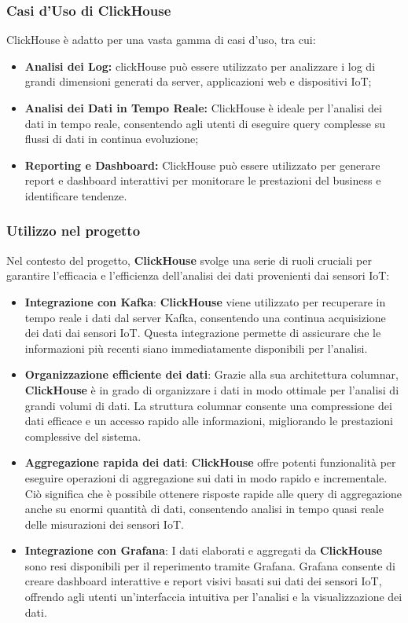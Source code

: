 \subsubsection{Casi d'Uso di ClickHouse}
ClickHouse è adatto per una vasta gamma di casi d'uso, tra cui:
\begin{itemize}
    \item \textbf{Analisi dei Log:} clickHouse può essere utilizzato per analizzare i log di grandi dimensioni generati da server, applicazioni web e dispositivi IoT;
    \item \textbf{Analisi dei Dati in Tempo Reale:} ClickHouse è ideale per l'analisi dei dati in tempo reale, consentendo agli utenti di eseguire query complesse su flussi di dati in continua evoluzione;
    \item \textbf{Reporting e Dashboard:} ClickHouse può essere utilizzato per generare report e dashboard interattivi per monitorare le prestazioni del business e identificare tendenze.
\end{itemize}


\subsubsection{Utilizzo nel progetto}
Nel contesto del progetto, \textbf{ClickHouse} svolge una serie di ruoli cruciali per garantire l'efficacia e l'efficienza dell'analisi dei dati provenienti dai sensori IoT:

\begin{itemize}
  \item \textbf{Integrazione con Kafka}: \textbf{ClickHouse} viene utilizzato per recuperare in tempo reale i dati dal server Kafka, consentendo una continua acquisizione dei dati dai sensori IoT. Questa integrazione permette di assicurare che le informazioni più recenti siano immediatamente disponibili per l'analisi.
  
  \item \textbf{Organizzazione efficiente dei dati}: Grazie alla sua architettura columnar, \textbf{ClickHouse} è in grado di organizzare i dati in modo ottimale per l'analisi di grandi volumi di dati. La struttura columnar consente una compressione dei dati efficace e un accesso rapido alle informazioni, migliorando le prestazioni complessive del sistema.
  
  \item \textbf{Aggregazione rapida dei dati}: \textbf{ClickHouse} offre potenti funzionalità per eseguire operazioni di aggregazione sui dati in modo rapido e incrementale. Ciò significa che è possibile ottenere risposte rapide alle query di aggregazione anche su enormi quantità di dati, consentendo analisi in tempo quasi reale delle misurazioni dei sensori IoT.
  
  \item \textbf{Integrazione con Grafana}: I dati elaborati e aggregati da \textbf{ClickHouse} sono resi disponibili per il reperimento tramite Grafana. Grafana consente di creare dashboard interattive e report visivi basati sui dati dei sensori IoT, offrendo agli utenti un'interfaccia intuitiva per l'analisi e la visualizzazione dei dati.
\end{itemize}

